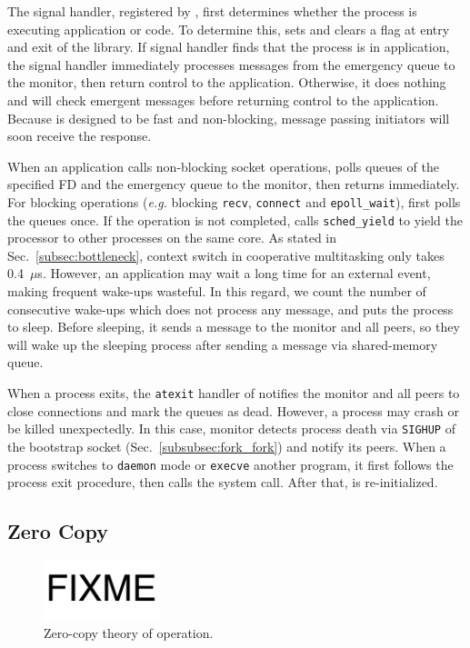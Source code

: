 The signal handler, registered by \libipc{}, first determines whether the process is executing application or \libipc{} code. To determine this, \libipc{} sets and clears a flag at entry and exit of the library. If signal handler finds that the process is in application, the signal handler immediately processes messages from the emergency queue to the monitor, then return control to the application. Otherwise, it does nothing and \libipc{} will check emergent messages before returning control to the application. Because \libipc{} is designed to be fast and non-blocking, message passing initiators will soon receive the response.

When an application calls non-blocking socket operations, \libipc{} polls queues of the specified FD and the emergency queue to the monitor, then returns immediately. For blocking operations (\textit{e.g.} blocking \texttt{recv}, \texttt{connect} and \texttt{epoll\_wait}), \libipc{} first polls the queues once. If the operation is not completed, \libipc{} calls \texttt{sched\_yield} to yield the processor to other processes on the same core. As stated in Sec.~\ref{subsec:bottleneck}, context switch in cooperative multitasking only takes 0.4~$\mu$s. However, an application may wait a long time for an external event, making frequent wake-ups wasteful. In this regard, we count the number of consecutive wake-ups which does not process any message, and puts the process to sleep. Before sleeping, it sends a message to the monitor and all peers, so they will wake up the sleeping process after sending a message via shared-memory queue.

When a process exits, the \texttt{atexit} handler of \libipc{} notifies the monitor and all peers to close connections and mark the queues as dead. However, a process may crash or be killed unexpectedly. In this case, monitor detects process death via \texttt{SIGHUP} of the bootstrap socket (Sec.~\ref{subsubsec:fork_fork}) and notify its peers. When a process switches to \texttt{daemon} mode or \texttt{execve} another program, it first follows the process exit procedure, then calls the system call. After that, \libipc{} is re-initialized.


\subsection{Zero Copy}
\label{subsec:zerocopy}

\begin{figure}[t]
	\centering
	\includegraphics[width=0.3\textwidth]{images/fixme}
	\caption{Zero-copy theory of operation.}
	\label{fig:zerocopy}
\end{figure}

